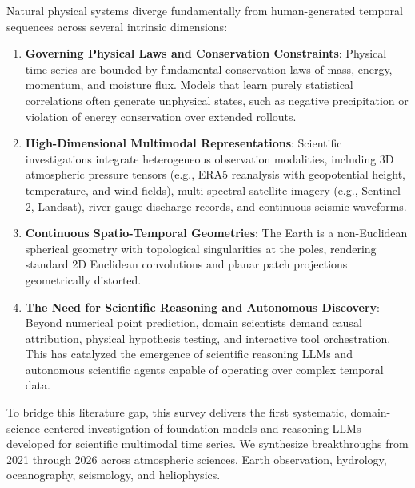 Natural physical systems diverge fundamentally from human-generated temporal sequences across several intrinsic dimensions:
\begin{enumerate}
    \item \textbf{Governing Physical Laws and Conservation Constraints}: Physical time series are bounded by fundamental conservation laws of mass, energy, momentum, and moisture flux. Models that learn purely statistical correlations often generate unphysical states, such as negative precipitation or violation of energy conservation over extended rollouts.
    \item \textbf{High-Dimensional Multimodal Representations}: Scientific investigations integrate heterogeneous observation modalities, including 3D atmospheric pressure tensors (e.g., ERA5 reanalysis with geopotential height, temperature, and wind fields), multi-spectral satellite imagery (e.g., Sentinel-2, Landsat), river gauge discharge records, and continuous seismic waveforms.
    \item \textbf{Continuous Spatio-Temporal Geometries}: The Earth is a non-Euclidean spherical geometry with topological singularities at the poles, rendering standard 2D Euclidean convolutions and planar patch projections geometrically distorted.
    \item \textbf{The Need for Scientific Reasoning and Autonomous Discovery}: Beyond numerical point prediction, domain scientists demand causal attribution, physical hypothesis testing, and interactive tool orchestration. This has catalyzed the emergence of scientific reasoning LLMs and autonomous scientific agents capable of operating over complex temporal data.
\end{enumerate}

To bridge this literature gap, this survey delivers the first systematic, domain-science-centered investigation of foundation models and reasoning LLMs developed for scientific multimodal time series. We synthesize breakthroughs from 2021 through 2026 across atmospheric sciences, Earth observation, hydrology, oceanography, seismology, and heliophysics.

